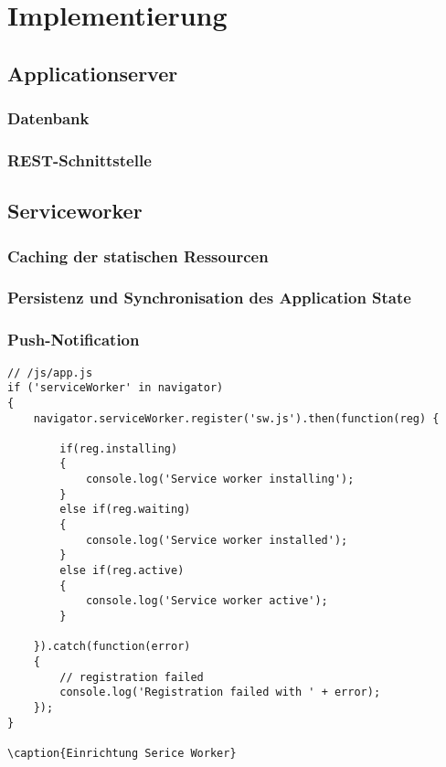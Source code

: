 \chapter{Implementierung}

\section{Applicationserver}

\subsection{Datenbank}
\label{subsec_implementierung_datenbank}

\subsection{REST-Schnittstelle}

\section{Serviceworker}

\subsection{Caching der statischen Ressourcen}

\subsection{Persistenz und Synchronisation des Application State}



\subsection{Push-Notification}


\begin{lstlisting}
// /js/app.js
if ('serviceWorker' in navigator)
{
    navigator.serviceWorker.register('sw.js').then(function(reg) {

        if(reg.installing)
        {
            console.log('Service worker installing');
        } 
        else if(reg.waiting)
        {
            console.log('Service worker installed');
        } 
        else if(reg.active)
        {
            console.log('Service worker active');
        }

    }).catch(function(error)
    {
        // registration failed
        console.log('Registration failed with ' + error);
    });
}

\caption{Einrichtung Serice Worker}
\end{lstlisting}
